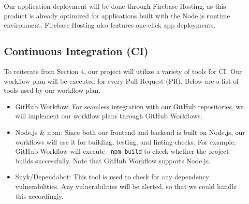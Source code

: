 \documentclass{article}
\begin{document}
Our application deployment will be done through Firebase Hosting, as this product is already optimized for applications built with the Node.js runtime environment. Firebase Hosting also features one-click app deployments.

\subsection{Continuous Integration (CI)}
To reiterate from Section 4, our project will utilize a variety of tools for CI. Our workflow plan will be executed for every Pull Request (PR). Below are a list of tools used by our workflow plan.
\begin{itemize}
	\item GitHub Workflow: For seamless integration with our GitHub repositories, we will implement our workflow plans through GitHub Workflows.  
	\item Node.js \& npm: Since both our frontend and backend is built on Node.js, our workflows will use it for building, testing, and linting checks. For example, GitHub Workflow will execute \verb| npm build| to check whether the project builds successfully. Note that GitHub Workflow supports Node.js.
	\item Snyk/Dependabot: This tool is used to check for any dependency vulnerabilities. Any vulnerabilities will be alerted, so that we could handle this accordingly.
\end{itemize}
\end{document}
